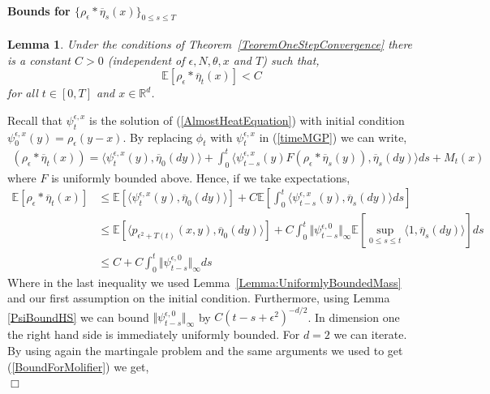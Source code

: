 \documentclass[12pt]{article}
\newenvironment {proof}{{\noindent\bf Proof }}{\hfill $\Box$ \medskip}
\newtheorem{lemma}[theorem]{Lemma}
\newcommand{\IE}{\mathbb E}
\begin{document}
\paragraph{Bounds for $\{ \rho_\epsilon * \overline{\eta}_s (x)\}_{0 \leq s \leq T}$}
\begin{lemma} \label{FirstBoundLocalDensity}
Under the conditions of Theorem~\ref{TeoremOneStepConvergence} there is a constant $C>0$ (independent of $\epsilon, N, \theta, x$ and $T$) such that,
\[ \IE[ \rho_\epsilon*\overline{\eta}_t(x) ] < C \]
for all $t \in [0,T]$ and $x \in \mathbb{R}^d$.
\end{lemma}
\begin{proof}
Recall that $\psi_t^{\epsilon,x}$ is the solution of (\ref{AlmostHeatEquation}) with initial condition $\psi_0^{\epsilon,x}(y)=\rho_\epsilon(y-x)$. By replacing $\phi_t$ with $\psi_t^{\epsilon,x}$ in (\ref{timeMGP}) we can write,
\begin{align}
(\rho_\epsilon*\overline{\eta}_t(x)) = \langle \psi_t^{\epsilon,x}(y), \overline{\eta}_0(dy) \rangle  + \int_0^t \langle \psi_{t-s}^{\epsilon,x}(y) F(\rho_\epsilon*\overline{\eta}_s(y)), \overline{\eta}_s(dy) \rangle ds + M_t(x) \label{MartingaleProblemMolifier}
\end{align}
where $F$ is uniformly bounded above. Hence, if we take expectations,
\begin{align}
\IE[\rho_\epsilon * \overline{\eta}_t(x)]
    &\le
    \IE[\langle \psi_t^{\epsilon,x}(y), \overline{\eta}_0(dy) \rangle] + C \IE[\int_0^t \langle \psi_{t-s}^{\epsilon,x}(y), \overline{\eta}_s(dy) \rangle ds] \nonumber \\ & \leq  \IE[\langle p_{\epsilon^2+T(t)}(x,y),\overline{\eta}_0(dy)\rangle] + C \int_0^t \Vert \psi_{t-s}^{\epsilon,0} \Vert_\infty \IE[\sup_{0 \leq s \leq t} \langle 1, \overline{\eta}_s(dy) \rangle] ds \\ & \leq C + C \int_0^t \Vert \psi_{t-s}^{\epsilon,0} \Vert_\infty ds \label{BoundForMolifier}
\end{align}
Where in the last inequality we used Lemma~\ref{Lemma:UniformlyBoundedMass} and our first assumption on the initial condition. Furthermore, using Lemma \ref{PsiBoundHS} we can bound $\Vert \psi_{t-s}^{\epsilon,0} \Vert_\infty$ by $C (t-s+\epsilon^2)^{-d/2}$. In dimension one the right hand side is immediately uniformly bounded. For $d=2$ we can iterate. By using again the martingale problem and the same arguments we used to get (\ref{BoundForMolifier}) we get,
\begin{equation} \label{IterationBoundPsi}

\end{equation}
\end{proof}
\end{document}
